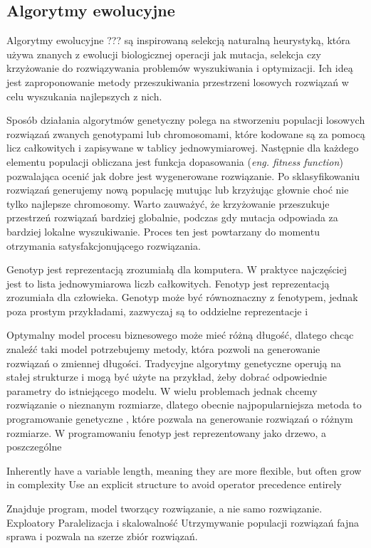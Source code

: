 \subsection{Algorytmy ewolucyjne}
Algorytmy ewolucyjne \cite{EA} ??? są inspirowaną selekcją naturalną heurystyką, która używa znanych z ewolucji biologicznej operacji jak mutacja, selekcja czy krzyżowanie do rozwiązywania problemów wyszukiwania i optymizacji. Ich ideą jest zaproponowanie metody przeszukiwania przestrzeni losowych rozwiązań w celu wyszukania najlepszych z nich. 

Sposób działania algorytmów genetyczny polega na stworzeniu populacji losowych rozwiązań zwanych genotypami lub chromosomami, które kodowane są za pomocą licz całkowitych i zapisywane w tablicy jednowymiarowej. Następnie dla każdego elementu populacji obliczana jest funkcja dopasowania (\textit{eng. fitness function}) pozwalająca ocenić jak dobre jest wygenerowane rozwiązanie. Po sklasyfikowaniu rozwiązań generujemy nową populację mutując lub krzyżując głownie choć nie tylko najlepsze chromosomy. Warto zauważyć, że krzyżowanie przeszukuje przestrzeń rozwiązań bardziej globalnie, podczas gdy mutacja odpowiada za bardziej lokalne wyszukiwanie. Proces ten jest powtarzany do momentu otrzymania satysfakcjonującego rozwiązania.  

Genotyp jest reprezentacją zrozumiałą dla komputera. W praktyce najczęściej jest to lista jednowymiarowa liczb całkowitych. 
Fenotyp jest reprezentacją zrozumiała dla człowieka. Genotyp może być równoznaczny z fenotypem, jednak poza prostym przykładami, zazwyczaj są to oddzielne reprezentacje i   

Optymalny model procesu biznesowego może mieć różną długość, dlatego chcąc znaleźć taki model potrzebujemy metody, która pozwoli na generowanie rozwiązań o zmiennej długości. Tradycyjne algorytmy genetyczne operują na stałej strukturze i mogą być użyte na przykład, żeby dobrać odpowiednie parametry do istniejącego modelu. W wielu problemach jednak chcemy rozwiązanie o nieznanym rozmiarze, dlatego obecnie najpopularniejsza metoda to programowanie genetyczne \cite{10.5555/138936}, które pozwala na generowanie rozwiązań o różnym rozmiarze. W programowaniu fenotyp jest reprezentowany jako drzewo, a poszczególne 

    Inherently have a variable length, meaning they are more flexible, but often grow in complexity
    Use an explicit structure to avoid operator precedence entirely
	
	Znajduje program, model tworzący rozwiązanie, a nie samo rozwiązanie.
Exploatory
Paralelizacja i skalowalność
Utrzymywanie populacji rozwiązań fajna sprawa i pozwala na szerze zbiór rozwiązań.

